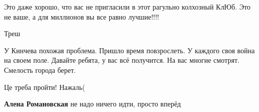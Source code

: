 \begin{itemize}
Это даже хорошо, что вас не пригласили в этот рагульно колхозный КлЮб. Это не ваше, а для миллионов вы все равно лучшие!!!!

 
Треш

 

У Кинчева похожая проблема. Пришло время повзрослеть. У каждого своя война на
своем поле. Давайте ребята, у вас всё получится. На вас многие смотрят.
Смелость города берет.


 
Це треба пройти! Нажаль(

\begin{itemize}
 
\textbf{Алена Романовская} не надо ничего идти, просто вперёд
\end{itemize}

\end{itemize}

